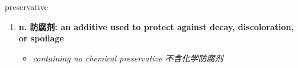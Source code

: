 
\begin{frame}
{\huge preservative}
\begin{center}
\begin{enumerate}\Large
  \item \textbf{n. 防腐剂: an additive used to protect against decay, discoloration, or spoilage}
  \begin{itemize}
    \item \em{\Large{containing no chemical preservative 不含化学防腐剂}}
  \end{itemize}
\end{enumerate}
\end{center}
\end{frame}
